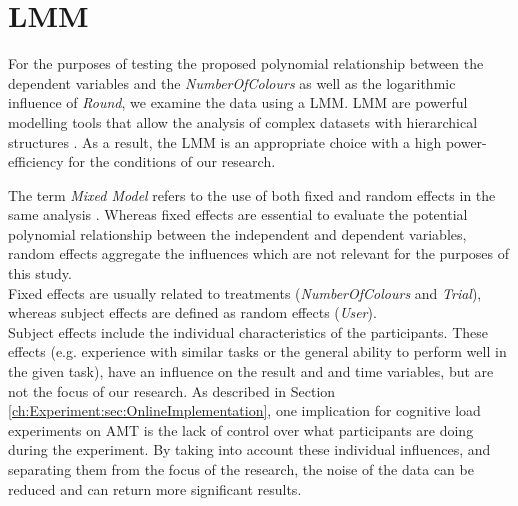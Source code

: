 \section{\acf{LMM}}
\label{ch:Evaluation:sec:LMM}

For the purposes of testing the proposed polynomial relationship between the dependent variables and the \textit{NumberOfColours} as well as the logarithmic influence of \textit{Round}, we examine the data using a \acl{LMM}. \ac{LMM} are powerful modelling tools that allow the analysis of complex datasets with hierarchical structures \citep{Galecki2013}. As a result, the \acf{LMM} is an appropriate choice with a high power-efficiency for the conditions of our research.

The term \textit{Mixed Model} refers to the use of both fixed and random effects in the same analysis \citep{Seltman2012}. Whereas fixed effects are essential to evaluate the potential polynomial relationship between the independent and dependent variables, random effects aggregate the influences which are not relevant for the purposes of this study. \\ 
Fixed effects are usually related to treatments (\textit{NumberOfColours} and \textit{Trial}), whereas subject effects are defined as random effects (\textit{User}).\\
Subject effects include the individual characteristics of the participants. These effects (e.g. experience with similar tasks or the general ability to perform well in the given task), have an influence on the result and and time variables, but are not the focus of our research. As described in Section \ref{ch:Experiment:sec:OnlineImplementation}, one implication for cognitive load experiments on \acf{AMT} is the lack of control over what participants are doing during the experiment. By taking into account these individual influences, and separating them from the focus of the research, the noise of the data can be reduced and can return more significant results.

